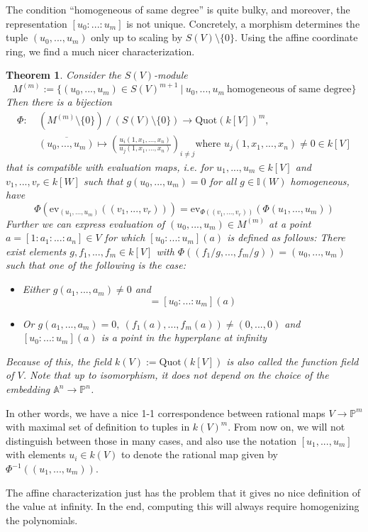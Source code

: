 \documentclass{scrartcl}
\newcommand{\I}{\mathbb{I}}
\newcommand{\Quot}{\mathrm{Quot}}
\newtheorem{theorem}[prop]{Theorem}
\theoremstyle{definition}
\begin{document}
The condition ``homogeneous of same degree'' is quite bulky, and moreover, the representation $[u_0 : ... : u_m]$ is not unique.
Concretely, a morphism determines the tuple $(u_0, ..., u_m)$ only up to scaling by $S(V) \setminus \{0\}$.
Using the affine coordinate ring, we find a much nicer characterization.
\begin{theorem}
    Consider the $S(V)$-module
    \begin{equation*}
        M^{(m)} := \{ (u_0, ..., u_m) \in S(V)^{m + 1} \ | \ u_0, ..., u_m \ \text{homogeneous of same degree} \}
    \end{equation*}
    Then there is a bijection
    \begin{align*}
        \Phi: \ &(M^{(m)} \setminus \{0\}) \ / \ (S(V) \setminus \{0\}) \to \Quot(k[V])^m, \\
        &\overline{(u_0, ..., u_m)} \mapsto \left( \frac {u_i(1, x_1, ..., x_n)} {u_j(1, x_1, ..., x_n)} \right)_{i \neq j} \text{where $u_j(1, x_1, ..., x_n) \neq 0 \in k[V]$}
    \end{align*}
    that is compatible with evaluation maps, i.e. for $u_1, ..., u_m \in k[V]$ and $v_1, ..., v_r \in k[W]$ such that $g(u_0, ..., u_m) = 0$ for all $g \in \I(W)$ homogeneous, have
    \begin{equation*}
        \Phi\left(\mathrm{ev}_{(u_1, ..., u_m)}((v_1, ..., v_r))\right) = \mathrm{ev}_{\Phi((v_1, ..., v_r))}\left(\Phi(u_1, ..., u_m)\right)
    \end{equation*}
    Further we can express evaluation of $(u_0, ..., u_m) \in M^{(m)}$ at a point $a = [1 : a_1 : ... : a_n] \in V$ for which $[u_0 : ... : u_m](a)$ is defined as follows:
    There exist elements $g, f_1, ..., f_m \in k[V]$ with $\Phi((f_1/g, ..., f_m/g)) = (u_0, ..., u_m)$ such that one of the following is the case:
    \begin{itemize}
        \item Either $g(a_1, ..., a_m) \neq 0$ and
        \begin{equation*}
            [1 : f_1(a)/g(a) : ... : f_m(a)/g(a)] = [u_0 : ... : u_m](a)
        \end{equation*}
        \item Or $g(a_1, ..., a_m) = 0, \ (f_1(a), ..., f_m(a)) \neq (0, ..., 0)$ and $[u_0 : ... : u_m](a)$ is a point in the hyperplane at infinity
    \end{itemize}
    Because of this, the field $k(V) := \Quot(k[V])$ is also called the function field of $V$. Note that up to isomorphism, it does not depend on the choice of the embedding $\mathbb{A}^n \to \mathbb{P}^n$.
\end{theorem}
In other words, we have a nice 1-1 correspondence between rational maps $V \to \mathbb{P}^m$ with maximal set of definition to tuples in $k(V)^m$.
From now on, we will not distinguish between those in many cases, and also use the notation $[u_1, ..., u_m]$ with elements $u_i \in k(V)$ to denote the rational map given by $\Phi^{-1}((u_1, ..., u_m))$.

The affine characterization just has the problem that it gives no nice definition of the value at infinity.
In the end, computing this will always require homogenizing the polynomials.
\end{document}
